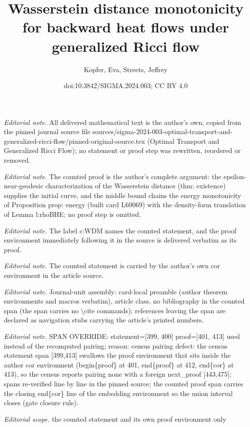 \documentclass[10pt,a4paper]{article}
\title{Wasserstein distance monotonicity for backward heat flows under generalized Ricci flow}
\author{Kopfer, Eva, Streets, Jeffrey}
\date{doi:10.3842/SIGMA.2024.003; CC BY 4.0}
\numberwithin{equation}{section}
\begin{document}
\maketitle
\setcounter{section}{3}
\setcounter{equation}{0}
\setcounter{thm}{5}
\noindent\textit{Editorial note.} All delivered mathematical text is the author's own, copied from the pinned journal source file sources/sigma-2024-003-optimal-transport-and-generalized-ricci-flow/pinned-original-source.tex (Optimal Transport and Generalized Ricci Flow); no statement or proof step was rewritten, reordered or removed.\par\medskip
\noindent\textit{Editorial note.} The counted proof is the author's complete argument: the epsilon-near-geodesic characterization of the Wasserstein distance (thm: existence) supplies the initial curve, and the middle bound chains the energy monotonicity of Proposition prop: energy (built card L60069) with the density-form translation of Lemma l:rhoBHE; no proof step is omitted.\par\medskip
\noindent\textit{Editorial note.} The label c:WDM names the counted statement, and the proof environment immediately following it in the source is delivered verbatim as its proof.\par\medskip
\noindent\textit{Editorial note.} The counted statement is carried by the author's own cor environment in the article source.\par\medskip
\noindent\textit{Editorial note.} Journal-unit assembly: card-local preamble (author theorem environments and macros verbatim), article class, no bibliography in the counted span (the span carries no \textbackslash{}cite commands); references leaving the span are declared as navigation stubs carrying the article's printed numbers.\par\medskip
\noindent\textit{Editorial note.} SPAN OVERRIDE: statement=[399, 400] proof=[401, 413] used instead of the recomputed pairing; reason: census pairing defect: the census statement span [399,413] swallows the proof environment that sits inside the author cor environment (begin\{proof\} at 401, end\{proof\} at 412, end\{cor\} at 413), so the census reports pairing none with a foreign next\_proof [443,475]; spans re-verified line by line in the pinned source; the counted proof span carries the closing end\{cor\} line of the embedding environment so the union interval closes (gate closure rule).\par\medskip
\noindent\textit{Editorial scope.} the counted statement and its own proof environment only\par\medskip
\end{document}

